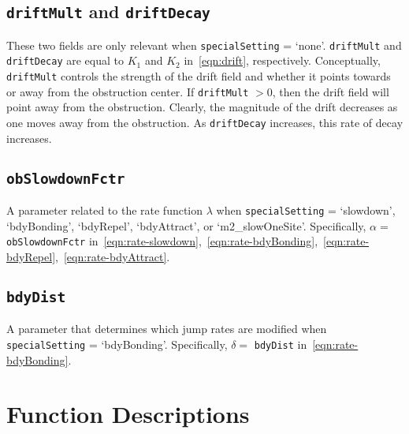 \documentclass[11pt, oneside]{article}   	%
\theoremstyle{definition}
\begin{document}
\subsection{\texttt{driftMult} and \texttt{driftDecay}}
These two fields are only relevant when \texttt{specialSetting} = `none'. \texttt{driftMult} and \texttt{driftDecay} are equal to $K_1$ and $K_2$ in~\eqref{eqn:drift}, respectively. Conceptually, \texttt{driftMult} controls the strength of the drift field and whether it points towards or away from the obstruction center. If \texttt{driftMult} $> 0$, then the drift field will point away from the obstruction. Clearly, the magnitude of the drift decreases as one moves away from the obstruction. As \texttt{driftDecay} increases, this rate of decay increases.

\subsection{\texttt{obSlowdownFctr}}
A parameter related to the rate function $\lambda$ when \texttt{specialSetting} = `slowdown', `bdyBonding', `bdyRepel', `bdyAttract', or `m2\_slowOneSite'. Specifically, $\alpha = $ \texttt{obSlowdownFctr} in~\eqref{eqn:rate-slowdown},~\eqref{eqn:rate-bdyBonding},~\eqref{eqn:rate-bdyRepel},~\eqref{eqn:rate-bdyAttract}.

\subsection{\texttt{bdyDist}}
A parameter that determines which jump rates are modified when \texttt{specialSetting} = `bdyBonding'. Specifically, $\delta = $ \texttt{bdyDist} in~\eqref{eqn:rate-bdyBonding}.

\section{Function Descriptions}
\end{document}
